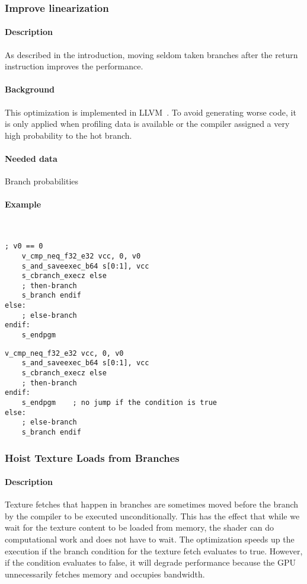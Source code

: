 \subsubsection{Improve linearization}
\paragraph{Description} As described in the introduction, moving seldom taken branches after the return instruction improves the performance.
\paragraph{Background} This optimization is implemented in LLVM~\cite{llvmLinearization}. To avoid generating worse code, it is only applied when profiling data is available or the compiler assigned a very high probability to the hot branch.
\paragraph{Needed data} Branch probabilities
\paragraph{Example}\ \\
\begin{minipage}{.47\textwidth}
	\begin{lstlisting}[caption={Linearization --- unoptimized},frame=tlrb,language={[amdgpu]Assembler}]
	; v0 == 0
	v_cmp_neq_f32_e32 vcc, 0, v0
	s_and_saveexec_b64 s[0:1], vcc
	s_cbranch_execz else
	; then-branch
	s_branch endif
else:
	; else-branch
endif:
	s_endpgm
	\end{lstlisting}
\end{minipage}\hfill
\begin{minipage}{.47\textwidth}
	\begin{lstlisting}[caption={Linearization --- optimized},frame=tlrb,language={[amdgpu]Assembler}]
	v_cmp_neq_f32_e32 vcc, 0, v0
	s_and_saveexec_b64 s[0:1], vcc
	s_cbranch_execz else
	; then-branch
endif:
	s_endpgm    ; no jump if the condition is true
else:
	; else-branch
	s_branch endif
	\end{lstlisting}
\end{minipage}

\subsubsection{Hoist Texture Loads from Branches}
\paragraph{Description} Texture fetches that happen in branches are sometimes moved before the branch by the compiler to be executed unconditionally. This has the effect that while we wait for the texture content to be loaded from memory, the shader can do computational work and does not have to wait. The optimization speeds up the execution if the branch condition for the texture fetch evaluates to true. However, if the condition evaluates to false, it will degrade performance because the GPU unnecessarily fetches memory and occupies bandwidth.
